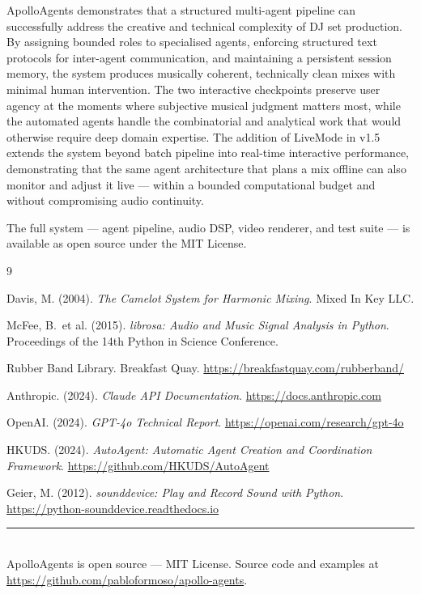 \documentclass[11pt,a4paper]{article}
\begin{document}
ApolloAgents demonstrates that a structured multi-agent pipeline can
successfully address the creative and technical complexity of DJ set
production. By assigning bounded roles to specialised agents, enforcing
structured text protocols for inter-agent communication, and maintaining a
persistent session memory, the system produces musically coherent, technically
clean mixes with minimal human intervention. The two interactive checkpoints
preserve user agency at the moments where subjective musical judgment matters
most, while the automated agents handle the combinatorial and analytical work
that would otherwise require deep domain expertise. The addition of LiveMode
in v1.5 extends the system beyond batch pipeline into real-time interactive
performance, demonstrating that the same agent architecture that plans a mix
offline can also monitor and adjust it live --- within a bounded computational
budget and without compromising audio continuity.

The full system --- agent pipeline, audio DSP, video renderer, and test suite
--- is available as open source under the MIT License.

\begin{thebibliography}{9}

Davis, M. (2004).
\textit{The Camelot System for Harmonic Mixing}.
Mixed In Key LLC.

McFee, B.\ et al. (2015).
\textit{librosa: Audio and Music Signal Analysis in Python}.
Proceedings of the 14th Python in Science Conference.

Rubber Band Library. Breakfast Quay.
\url{https://breakfastquay.com/rubberband/}

Anthropic. (2024).
\textit{Claude API Documentation}.
\url{https://docs.anthropic.com}

OpenAI. (2024).
\textit{GPT-4o Technical Report}.
\url{https://openai.com/research/gpt-4o}

HKUDS. (2024).
\textit{AutoAgent: Automatic Agent Creation and Coordination Framework}.
\url{https://github.com/HKUDS/AutoAgent}

Geier, M. (2012).
\textit{sounddevice: Play and Record Sound with Python}.
\url{https://python-sounddevice.readthedocs.io}

\end{thebibliography}

\vspace{12pt}
\noindent\rule{\linewidth}{0.4pt}\\[4pt]
{\small ApolloAgents is open source --- MIT License.
Source code and examples at
\url{https://github.com/pabloformoso/apollo-agents}.}
\end{document}
